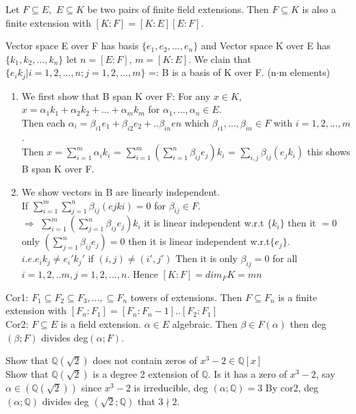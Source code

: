 \documentclass{article}
\newcommand\Q{\ensuremath{\mathbb{Q}}}
\begin{document}
\begin{theorem}
    Let $F \subseteq E,$ $E \subseteq K$ be two pairs of finite field extensions. Then $F \subseteq K$ is also a finite extension with $[K:F] = [K:E][E:F]$.
\end{theorem}
\begin{Proof}
    Vector space E over F has basis $\{e_1, e_2, ..., e_n\}$ and Vector space K over E has $\{k_1, k_2, ..., k_n\}$ let $n = [E:F]$, $m = [K:E]$.
    We clain that $\{e_ik_j | i = 1,2, ..., n ; j = 1,2,..., m\}$ =: B is a basis of K over F. (n$\cdot$m elements)
    \begin{enumerate}
        \item We first show that B span K over F:
        For any $x \in K$, $x = \alpha _1 k_1 + \alpha_2 k_2 + ... + \alpha _m k_m$ for $\alpha_1,..., \alpha_n \in E$. 
    \\   Then each $\alpha_i = \beta_{i1} e_1 + \beta_{i2} e_2+ .. \beta_{in} en$ which $\beta_{i1}, ...,\beta_{in} \in F$ with $i =1,2,..., m$.
    \\ Then $x =\sum_{i=1}^{m} \alpha_i k_i$ =  $\sum_{i=1}^{m} (\sum_{i=1}^{n} \beta_{ij} e_j) k_i$ = $\sum_{i,j} \beta_{ij} (e_jk_i)$ this shows B span K over F.
    \item We show vectors in B are linearly independent.
  \\ If $\sum_{i=1}^m \sum_{j=1}^n \beta_{ij}(ejki) = 0$ for $\beta_{ij} \in F$.
  \\ $\Rightarrow $ $\sum_{i=1}^m (\sum_{j=1}^n \beta_{ij}e_j)k_i$  it is linear independent w.r.t $\{k_i\}$ then it $= 0$ only $(\sum_{j=1}^n \beta_{ij}e_j) = 0$ then it is linear independent w.r.t$\{e_j\}$. 
  \\ $i.e. e_ik_j \neq e_i'k_j'$ if $(i,j) \neq (i', j')$ Then  it is only $\beta_{ij} = 0$ for all$i =1,2,..m, j = 1,2,...,n$. Hence $[K:F] = dim_F K =mn$
    \end{enumerate}
\end{Proof}

\begin{note}
Cor1: $F_1 \subseteq F_2 \subseteq F_3 ,..., \subseteq F_n$ towers of extensions. Then $F \subseteq F_n$ is a finite extension with $[F_n:F_1] = [F_n:F_n-1]..[F_2:F_1]$
\\Cor2: $F \subseteq E$ is a field extension. $\alpha \in E$ algebraic. Then $\beta \in F(\alpha)$ then deg$(\beta; F)$ divides deg$(\alpha; F)$.
\end{note}

\begin{Example}
Show that $\Q(\sqrt{2})$ does not contain zeros of $x^3-2 \in \Q[x]$
  \\  Show that $\Q(\sqrt{2})$ is a degree 2 extension of $\Q$. Is it has a zero of $x^3-2$, say $\alpha \in (\Q(\sqrt{2}))$ since $x^3-2$ is irreducible, deg $(\alpha; \Q) = 3$ By cor2, deg $(\alpha; \Q)$ divides deg $(\sqrt{2}; \Q)$  that $3 \nmid 2$.
\end{Example}
\end{document}
